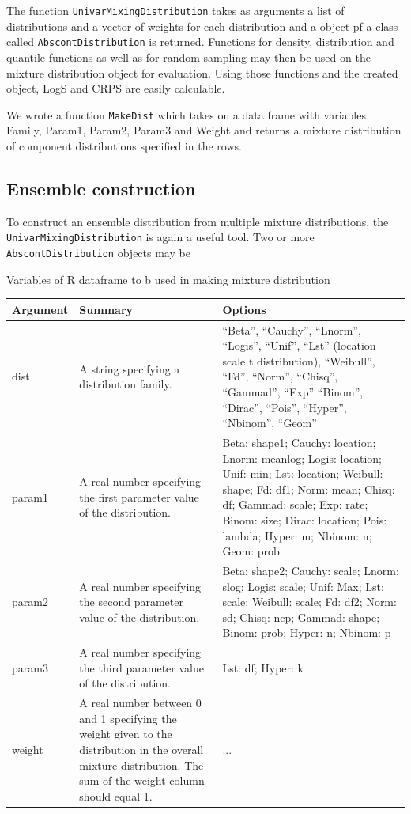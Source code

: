 \documentclass{article}\usepackage[]{graphicx}\usepackage[]{color}
\begin{document}
The function 
\texttt{UnivarMixingDistribution} takes as arguments a list of distributions
and a vector of weights for each distribution and a object pf a class called 
\texttt{AbscontDistribution} is returned. Functions for density, distribution
and quantile functions as well as for random sampling may then be used on the
mixture distribution object for evaluation. Using those functions and the 
created object, LogS and CRPS are easily calculable. 

We wrote a function \texttt{MakeDist} which takes on a data frame with variables
Family, Param1, Param2, Param3 and Weight and returns a mixture distribution 
of component distributions specified in the rows. 

\subsection{Ensemble construction}

To construct an ensemble distribution from multiple mixture distributions, the 
\texttt{UnivarMixingDistribution} is again a useful tool. Two or more 
\texttt{AbscontDistribution} objects may be 




Variables of R dataframe to b used in making mixture distribution 
\begin{center}
    \begin{tabular}{ | l | p{4cm} | p{7cm} |}
    \hline
    Argument & Summary & Options \\ \hline
    dist & A string specifying a distribution family.  & “Beta”, “Cauchy”, 
    “Lnorm”, “Logis”, “Unif”, “Lst” (location scale t distribution), 
    “Weibull”, “Fd”, “Norm”,  “Chisq”, 
    “Gammad”, “Exp”
	 “Binom”, “Dirac”, “Pois”, “Hyper”, “Nbinom”, “Geom” \\ \hline
    param1 & A real number specifying the first parameter value of the 
    distribution. & Beta: shape1; 
	Cauchy: location; 
	Lnorm: meanlog; 
	Logis: location; 
	Unif: min; 
	Lst: location; 
	Weibull: shape;
	Fd: df1;
	Norm: mean;
	Chisq: df;
	Gammad: scale;
	Exp: rate; 
	Binom: size;
	Dirac: location;
	Pois: lambda;
	Hyper: m;
	Nbinom: n;
	Geom: prob
     \\ \hline
    param2 & A real number specifying the second parameter value of the 
    distribution. & Beta: shape2; 
	Cauchy: scale; 
	Lnorm: slog; 
	Logis: scale; 
	Unif: Max; 
	Lst: scale; 
	Weibull: scale; 
	Fd: df2; 
	Norm: sd; 
	Chisq: ncp; 
	Gammad: shape; 
	Binom: prob; 
	Hyper: n; 
	Nbinom: p \\
    \hline
    param3 & A real number specifying the third parameter value of the 
    distribution. & Lst: df;
	Hyper: k \\
	\hline
	weight & A real number between 0 and 1 specifying the weight given to the 
	distribution in the overall mixture distribution. The sum of the weight 
	column should equal 1. & ...
	\\
	\hline
    \end{tabular}
\end{center}
\end{document}
